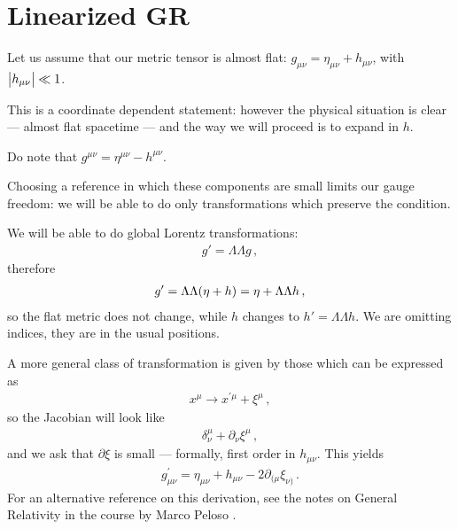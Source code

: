 \documentclass[main.tex]{subfiles}
\begin{document}
\section{Linearized GR}




Let us assume that our metric tensor is almost flat: \(g_{\mu \nu } = \eta_{\mu \nu } + h_{\mu \nu }\), with \(\abs{h_{\mu \nu }} \ll 1\).

This is a coordinate dependent statement: however the physical situation is clear --- almost flat spacetime --- and the way we will proceed is to expand in \(h\).

Do note that \(g^{\mu \nu } = \eta^{\mu \nu } - h^{\mu \nu }\). 

Choosing a reference in which these components are small limits our gauge freedom: we will be able to do only transformations which preserve the condition. 

We will be able to do global Lorentz transformations: 
%
\begin{align}
g' = \Lambda \Lambda g
\,,
\end{align}
%
therefore 
%
\begin{align}
g' = \Lambda \Lambda \qty(\eta + h) = \eta + \Lambda \Lambda h
\,,
\end{align}
%
so the flat metric does not change, while \(h\) changes to  \(h' = \Lambda \Lambda h\). We are omitting indices, they are in the usual positions. 

A more general class of transformation is given by those which can be expressed as 
%
\begin{align}
x^{\mu } \rightarrow x^{\prime \mu } + \xi^{\mu }
\,,
\end{align}
%
so the Jacobian will look like 
%
\begin{align}
\delta^{ \mu }_{\nu } + \partial_{\nu } \xi^{ \mu }
\,,
\end{align}
%
and we ask that \(\partial \xi \) is small --- formally, first order in \(h_{\mu \nu }\). This yields 
%
\begin{align}
g^{\prime }_{\mu \nu } = \eta_{\mu \nu } + h_{\mu \nu } - 2 \partial_{(\mu  }\xi_{\nu )}
\,.
\end{align}
%
For an alternative reference on this derivation, see the notes on General Relativity in the course by Marco Peloso \cite[section 10]{tissinoGeneralRelativityNotes2020}.
\end{document}
